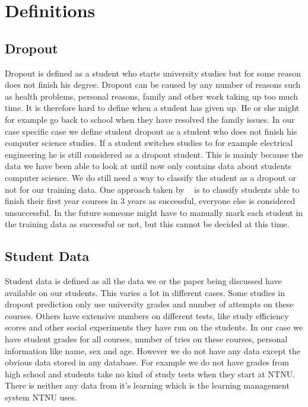\section{Definitions}
\subsection{Dropout}
Dropout is defined as a student who starts university studies but for some reason does not finish his degree. 
Dropout can be caused by any number of reasons such as health problems, personal reasons, family and other work taking up too much time.
It is therefore hard to define when a student has given up. 
He or she might for example go back to school when they have resolved the family issues.
In our case specific case we define student dropout as a student who does not finish his computer science studies.
If a student switches studies to for example electrical engineering he is still considered as a dropout student.
This is mainly because the data we have been able to look at until now only contains data about students computer science.
We do still need a way to classify the student as a dropout or not for our training data.
One approach taken by ~\cite{7} is to classify students able to finish their first year courses in 3 years as successful,
everyone else is considered unsuccessful.
In the future someone might have to manually mark each student in the training data as successful or not,
but this cannot be decided at this time.

\subsection{Student Data}
Student data is defined as all the data we or the paper being discussed have available on our students.
This varies a lot in different cases.
Some studies in dropout prediction only use university grades and number of attempts on these courses.
Others have extensive numbers on different tests,
like study efficiency scores and other social experiments they have run on the students. 
In our case we have student grades for all courses,
number of tries on these courses,
personal information like name, sex and age.
However we do not have any data except the obvious data stored in any database.
For example we do not have grades from high school and students take no kind of study tests when they start at NTNU.
There is neither any data from it's learning which is the learning management system NTNU uses. 

